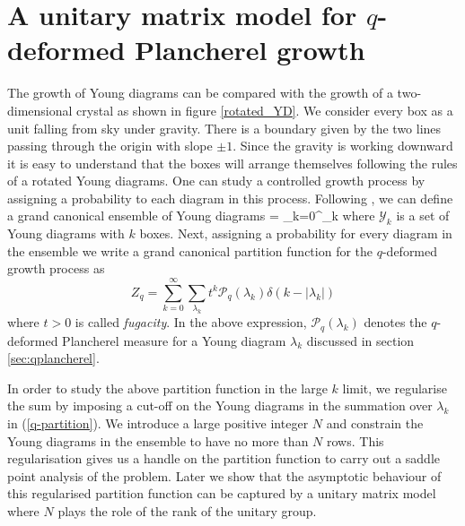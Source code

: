 \documentclass[3p,12pt]{elsarticle}
\numberwithin{equation}{section}
\begin{document}
\section{A unitary matrix model for $q$-deformed Plancherel growth}

The growth of Young diagrams can be compared with the growth of a two-dimensional crystal as shown in figure \ref{rotated_YD}. We consider every box as a unit falling from sky under gravity. There is a boundary given by the two lines passing through the origin with slope $\pm1$. Since the gravity is working downward it is easy to understand that the boxes will arrange themselves following the rules of a rotated Young diagrams. One can study a controlled growth process by assigning a probability to each diagram in this process. Following \cite{Eynard:2008mt, Chattopadhyay:2019pkl}, we can define a grand canonical ensemble of Young diagrams
%
\ben
{} = \bigcup_{k=0}^\infty {}_k
\een
%
where $\mathcal{Y}_k$ is a set of Young diagrams with $k$ boxes. Next, assigning a probability for every diagram in the ensemble we write a grand canonical partition function for the $q$-deformed growth process as
\begin{equation}
\label{q-partition}
Z_q=\sum_{k=0}^{\infty}\sum_{\lambda_k} t^k \mathcal{P}_q(\lambda_k)\delta(k-|\lambda_k|)
\end{equation}
where $t>0$ is called \emph{fugacity}. In the above expression, $\mathcal{P}_q(\lambda_k)$ denotes the $q$-deformed Plancherel measure for a Young diagram $\lambda_k$ discussed in section \ref{sec:qplancherel}.

In order to study the above partition function in the large $k$ limit, we regularise the sum by imposing a cut-off on the Young diagrams in the summation over $\lambda_k$ in (\ref{q-partition}).  We introduce a large positive integer $N$ and constrain the Young diagrams in the ensemble to have no more than $N$ rows. This regularisation gives us a handle on the partition function to carry out a saddle point analysis of the problem. Later we show that the asymptotic behaviour of this regularised partition function can be captured by a unitary matrix model where $N$ plays the role of the rank of the unitary group.
\end{document}
